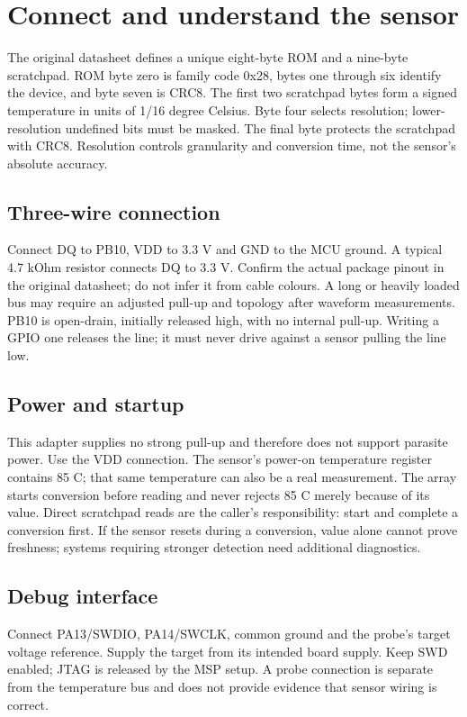 \section{Connect and understand the sensor}
The original datasheet\cite{ds18b20} defines a unique eight-byte ROM and a nine-byte
scratchpad. ROM byte zero is family code 0x28, bytes one through six identify the
device, and byte seven is CRC8. The first two scratchpad bytes form a signed
temperature in units of 1/16 degree Celsius. Byte four selects resolution;
lower-resolution undefined bits must be masked. The final byte protects the
scratchpad with CRC8. Resolution controls granularity and conversion time, not
the sensor's absolute accuracy.

\subsection{Three-wire connection}
Connect DQ to PB10, VDD to 3.3 V and GND to the MCU ground. A typical 4.7 kOhm
resistor connects DQ to 3.3 V. Confirm the actual package pinout in the original
datasheet; do not infer it from cable colours. A long or heavily loaded bus may
require an adjusted pull-up and topology after waveform measurements. PB10 is
open-drain, initially released high, with no internal pull-up. Writing a GPIO one
releases the line; it must never drive against a sensor pulling the line low.

\subsection{Power and startup}
This adapter supplies no strong pull-up and therefore does not support parasite
power. Use the VDD connection. The sensor's power-on temperature register contains
85 C; that same temperature can also be a real measurement. The array starts
conversion before reading and never rejects 85 C merely because of its value.
Direct scratchpad reads are the caller's responsibility: start and complete a
conversion first. If the sensor resets during a conversion, value alone cannot
prove freshness; systems requiring stronger detection need additional diagnostics.

\subsection{Debug interface}
Connect PA13/SWDIO, PA14/SWCLK, common ground and the probe's target voltage
reference. Supply the target from its intended board supply. Keep SWD enabled;
JTAG is released by the MSP setup. A probe connection is separate from the
temperature bus and does not provide evidence that sensor wiring is correct.
